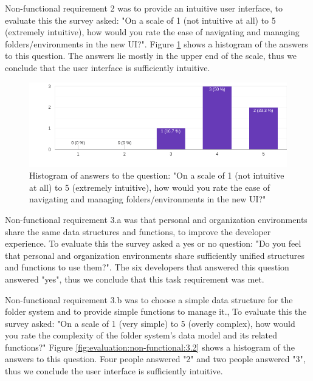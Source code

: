 
Non-functional requirement 2 was to provide an intuitive user interface, 
to evaluate this the survey asked: 
"On a scale of 1 (not intuitive at all) to 5 (extremely intuitive), how would you
rate the ease of navigating and managing folders/environments in the new UI?".
Figure \ref{fig:evaluation:non-functional:2} shows a histogram of the answers to this question.
The answers lie mostly in the upper end of the scale, thus we conclude that the user
interface is sufficiently intuitive.

\begin{figure}[h]
	\centering
  \includegraphics[scale=0.55]{../../figures/survey/2-ui.png}
	\caption{Histogram of answers to the question: "On a scale of 1 (not intuitive at all) to 5 (extremely intuitive), how would you
rate the ease of navigating and managing folders/environments in the new UI?"}
	\label{fig:evaluation:non-functional:2}
\end{figure}


Non-functional requirement 3.a was that personal and organization environments share the
same data structures and functions, to improve the developer experience.
To evaluate this the survey asked a yes or no question:
"Do you feel that personal and organization environments share sufficiently unified
structures and functions to use them?".
The six developers that answered this question answered "yes", thus we conclude that this
task requirement was met.


Non-functional requirement 3.b was to choose a simple data structure for the folder
system and to provide simple functions to manage it.,
To evaluate this the survey asked: 
"On a scale of 1 (very simple) to 5 (overly complex), how would you rate the
complexity of the folder system’s data model and its related functions?"
Figure \ref{fig:evaluation:non-functional:3.2} shows a histogram of the answers to this question.
Four people answered "2" and two people answered "3", thus we conclude the user interface
is sufficiently intuitive.


